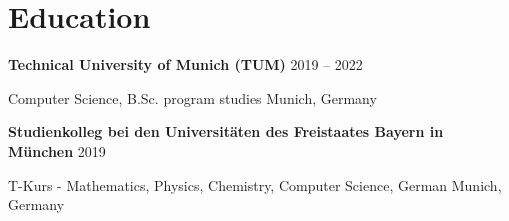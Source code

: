 \documentclass[10pt,a4paper]{article}
\begin{document}
\section{Education}
\textbf{Technical University of Munich (TUM)} \hfill 2019 -- 2022\par
Computer Science, B.Sc. program studies \hfill Munich, Germany\par

\vspace{3pt}
\textbf{Studienkolleg bei den Universit\"aten des Freistaates Bayern in M\"unchen} \hfill 2019\par
T-Kurs - Mathematics, Physics, Chemistry, Computer Science, German \hfill Munich, Germany\par
\end{document}
